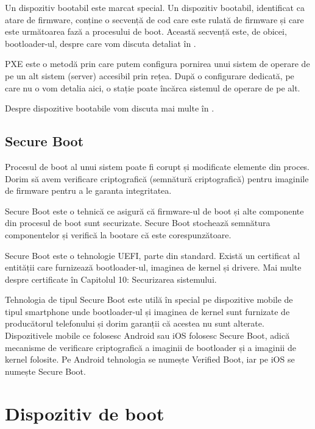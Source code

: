 Un dispozitiv bootabil este marcat special. Un dispozitiv bootabil, identificat
ca atare de firmware, conține o secvență de cod care este rulată de firmware și
care este următoarea fază a procesului de boot. Această secvență este, de
obicei, bootloader-ul, despre care vom discuta detaliat în
.

PXE este o metodă prin care putem configura pornirea unui sistem de operare de
pe un alt sistem (server) accesibil prin rețea. După o configurare dedicată, pe
care nu o vom detalia aici, o stație poate încărca sistemul de operare de pe
alt.

Despre dispozitive bootabile vom discuta mai multe în
.

\subsection{Secure Boot}
\label{sec:boot-firmware-secureboot}

Procesul de boot al unui sistem poate fi corupt și modificate elemente din
proces. Dorim să avem verificare criptografică (semnătură criptografică) pentru
imaginile de firmware pentru a le garanta integritatea.

Secure Boot este o tehnică ce asigură că firmware-ul de boot și alte componente
din procesul de boot sunt securizate. Secure Boot stochează semnătura
componentelor și verifică la bootare că este corespunzătoare.

Secure Boot este o tehnologie UEFI, parte din standard. Există un certificat al
entității care furnizează bootloader-ul, imaginea de kernel și drivere. Mai
multe despre certificate în Capitolul 10: Securizarea sistemului.

Tehnologia de tipul Secure Boot este utilă în special pe dispozitive mobile de
tipul smartphone unde bootloader-ul și imaginea de kernel sunt furnizate de
producătorul telefonului și dorim garanții că acestea nu sunt alterate.
Dispozitivele mobile ce folosesc Android sau iOS folosesc Secure Boot, adică
mecanisme de verificare criptografică a imaginii de bootloader și a imaginii de
kernel folosite. Pe Android tehnologia se numește Verified Boot, iar pe iOS se
numește Secure Boot.

\section{Dispozitiv de boot}
\label{sec:boot-bootdev}

